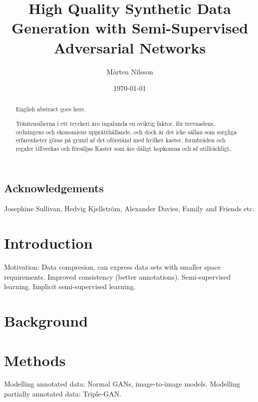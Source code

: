 \documentclass{kththesis}
\title{High Quality Synthetic Data Generation with Semi-Supervised Adversarial Networks}
\author{Mårten Nilsson}
\date{\today}
\begin{document}
\frontmatter

\titlepage

\begin{abstract}
  English abstract goes here.

  \blindtext
\end{abstract}


\begin{otherlanguage}{swedish}
  \begin{abstract}
    Träutensilierna i ett tryckeri äro ingalunda en oviktig faktor,
    för trevnadens, ordningens och ekonomiens upprätthållande, och
    dock är det icke sällan som sorgliga erfarenheter göras på grund
    af det oförstånd med hvilket kaster, formbräden och regaler
    tillverkas och försäljas Kaster som äro dåligt hopkomna och af
    otillräckligt.
  \end{abstract}
\end{otherlanguage}

\section*{Acknowledgements}
Josephine Sullivan, Hedvig Kjellström, Alexander Davies, Family and Friends etc. 

\tableofcontents


\mainmatter


\chapter{Introduction}
Motivation: Data compresion, can express data sets with smaller space requirements. Improved consistency (better annotations). Semi-supervised learning. Implicit semi-supervised learning.




\chapter{Background}


\chapter{Methods}
Modelling annotated data: Normal GANs, image-to-image models.
Modelling partially annotated data: Triple-GAN.

\end{document}
